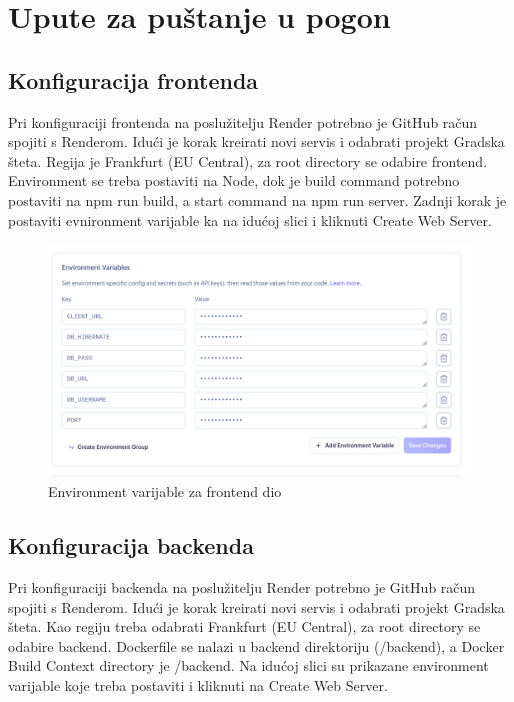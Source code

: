 			\eject 
		
		\section{Upute za puštanje u pogon}
		
			\subsection{Konfiguracija frontenda}
			Pri konfiguraciji frontenda na poslužitelju Render potrebno je GitHub račun spojiti s Renderom. Idući je korak kreirati novi servis i odabrati projekt Gradska šteta. Regija je Frankfurt (EU Central), za root directory se odabire frontend. Environment se treba postaviti na Node, dok je build command potrebno postaviti na npm run build, a start command na npm run server. Zadnji korak je postaviti evnironment varijable ka na idućoj slici i kliknuti Create Web Server.
			
			
			\begin{figure}[H]
			\includegraphics[scale=0.4]{slike/frontendEnvironment.PNG} %
			\centering
			\caption{Environment varijable za frontend dio}
			\label{fig:implementacija}
		\end{figure}
		
		\subsection{Konfiguracija backenda}
			
			Pri konfiguraciji backenda na poslužitelju Render potrebno je GitHub račun spojiti s Renderom. Idući je korak kreirati novi servis i odabrati projekt Gradska šteta. Kao regiju treba odabrati Frankfurt (EU Central), za root directory se odabire backend. Dockerfile se nalazi u backend direktoriju (/backend), a Docker Build Context directory je /backend. Na idućoj slici su prikazane environment varijable koje treba postaviti i kliknuti na Create Web Server.
			
